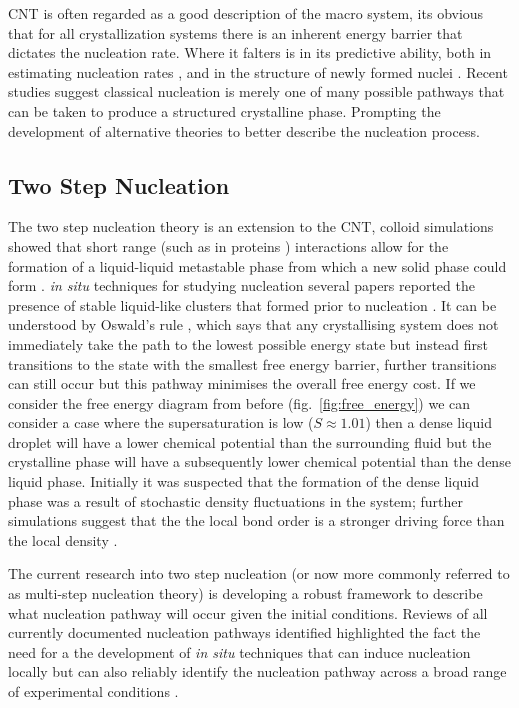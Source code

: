 CNT is often regarded as a good description of the macro system, its obvious
that for all crystallization systems there is an inherent energy barrier that 
dictates the nucleation rate. Where it falters is in its predictive ability, 
both in estimating nucleation rates \cite{Gharibeh2005, Vekilov2010}, and in 
the structure of newly formed nuclei \cite{Lee1999, Yau2001}. Recent studies 
suggest classical nucleation is merely one of many possible pathways that can 
be taken to produce a structured crystalline phase. Prompting the development of alternative theories to better describe the nucleation process.

\subsection{Two Step Nucleation}
The two step nucleation theory is an extension to the CNT, colloid simulations 
showed that short range (such as in proteins \cite{Wolde1997, Gliko2005}) 
interactions allow for the formation of a liquid-liquid metastable phase from 
which a new solid phase could form \cite{Anderson2002, Karthika2016}. 
\textit{in situ} techniques for studying nucleation several papers reported 
the presence of stable liquid-like clusters that formed prior to nucleation
\cite{Savage2009, Wolde1997, Soga1999}. It can be understood by Oswald's rule
\cite{Ostwald1897}, which says that any crystallising system does not immediately 
take the path to the lowest possible energy state but instead first transitions 
to the state with the smallest free energy barrier, further transitions can still 
occur but this pathway minimises the overall free energy cost. If we consider 
the free energy diagram from before (fig.~\ref{fig:free_energy}) we can consider 
a case where the supersaturation is low ($S\approx1.01$) then a dense liquid 
droplet will have a lower chemical potential than the surrounding fluid but 
the crystalline phase will have a subsequently lower chemical potential than 
the dense liquid phase. Initially it was suspected that the formation of the 
dense liquid phase was a result of stochastic density fluctuations in the system; 
further simulations suggest that the the local bond order is a stronger driving 
force than the local density \cite{Tan2013}. 

The current research into two step nucleation (or now more commonly referred 
to as multi-step nucleation theory) is developing a robust framework to 
describe what nucleation pathway will occur given the initial conditions. 
Reviews of all currently documented nucleation pathways identified highlighted 
the fact the need for a the development of \textit{in situ} techniques that 
can induce nucleation locally but can also reliably identify the nucleation 
pathway across a broad range of experimental conditions \cite{Karthika2016, Fu2021}. 

